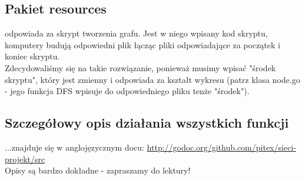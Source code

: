 \subsection{Pakiet resources}
\indent odpowiada za skrypt tworzenia grafu. Jest w niego wpisany kod skryptu, komputery budują odpowiedni plik łącząc pliki odpowiadające za początek i koniec skryptu.\\
\indent Zdecydowaliśmy się na takie rozwiązanie, ponieważ musimy wpisać "środek skryptu", który jest zmienny i odpowiada za kształt wykresu (patrz klasa node.go - jego funkcja DFS wpisuje do odpowiedniego pliku tenże "środek").

\subsection{Szczegółowy opis działania wszystkich funkcji}
...znajduje się w anglojęzycznym docu: \url{http://godoc.org/github.com/pitex/sieci-projekt/src}\\
\indent Opisy są bardzo dokładne - zapraszamy do lektury!
